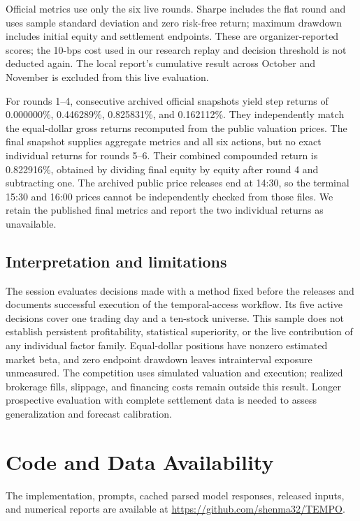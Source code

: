\documentclass[conference]{IEEEtran}
\begin{document}
Official metrics use only the six live rounds. Sharpe includes the flat round and uses sample standard deviation and zero risk-free return; maximum drawdown includes initial equity and settlement endpoints\cite{task2protocol}. These are organizer-reported scores; the 10-bps cost used in our research replay and decision threshold is not deducted again. The local report's cumulative result across October and November is excluded from this live evaluation.

For rounds 1--4, consecutive archived official snapshots yield step returns of 0.000000\%, 0.446289\%, 0.825831\%, and 0.162112\%. They independently match the equal-dollar gross returns recomputed from the public valuation prices. The final snapshot supplies aggregate metrics and all six actions, but no exact individual returns for rounds 5--6. Their combined compounded return is 0.822916\%, obtained by dividing final equity by equity after round 4 and subtracting one. The archived public price releases end at 14:30, so the terminal 15:30 and 16:00 prices cannot be independently checked from those files. We retain the published final metrics and report the two individual returns as unavailable.

\subsection{Interpretation and limitations}
The session evaluates decisions made with a method fixed before the releases and documents successful execution of the temporal-access workflow. Its five active decisions cover one trading day and a ten-stock universe. This sample does not establish persistent profitability, statistical superiority, or the live contribution of any individual factor family. Equal-dollar positions have nonzero estimated market beta, and zero endpoint drawdown leaves intrainterval exposure unmeasured. The competition uses simulated valuation and execution; realized brokerage fills, slippage, and financing costs remain outside this result. Longer prospective evaluation with complete settlement data is needed to assess generalization and forecast calibration.

\FloatBarrier

\section*{Code and Data Availability}
The implementation, prompts, cached parsed model responses, released inputs, and numerical reports are available at \url{https://github.com/shenma32/TEMPO}.


\end{document}
